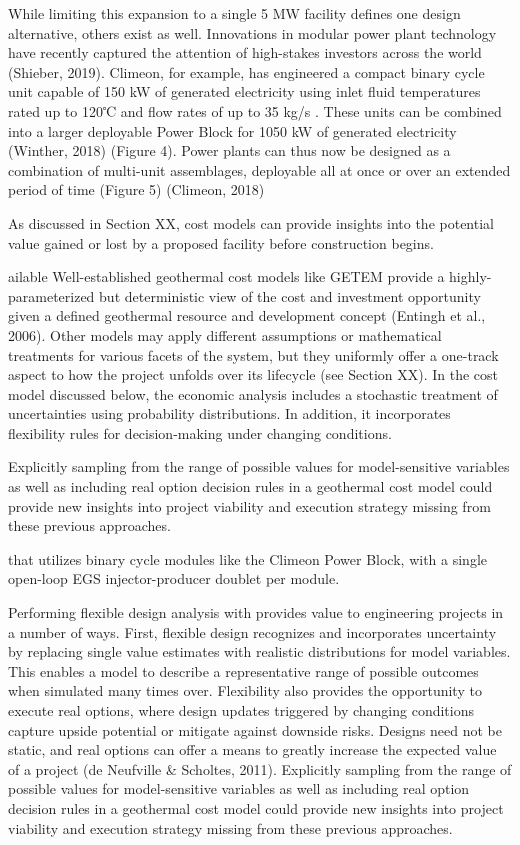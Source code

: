 While limiting this expansion to a single 5 MW facility defines one design alternative, others exist as well. Innovations in modular power plant technology have recently captured the attention of high-stakes investors across the world (Shieber, 2019). Climeon, for example, has engineered a compact binary cycle unit capable of 150 kW of generated electricity using inlet fluid temperatures rated up to 120℃ and flow rates of up to 35 kg/s \citep{climeon_climeon_2021}. These units can be combined into a larger deployable Power Block for 1050 kW of generated electricity (Winther, 2018) (Figure 4). Power plants can thus now be designed as a combination of multi-unit assemblages, deployable all at once or over an extended period of time (Figure 5) (Climeon, 2018)





As discussed in Section XX, cost models can provide insights into the potential value gained or lost by a proposed facility before construction begins.

ailable 
Well-established geothermal cost models like GETEM provide a highly-parameterized but deterministic view of the cost and investment opportunity given a defined geothermal resource and development concept (Entingh et al., 2006). Other models may apply different assumptions or mathematical treatments for various facets of the system, but they uniformly offer a one-track aspect to how the project unfolds over its lifecycle (see Section XX). In the cost model discussed below, the economic analysis includes a stochastic treatment of uncertainties using probability distributions. In addition, it incorporates flexibility rules for decision-making under changing conditions.  


Explicitly sampling from the range of possible values for model-sensitive variables as well as including real option decision rules in a geothermal cost model could provide new insights into project viability and execution strategy missing from these previous approaches.

that utilizes binary cycle modules like the Climeon Power Block, with a single open-loop EGS injector-producer doublet per module. 



Performing flexible design analysis with provides value to engineering projects in a number of ways. First, flexible design recognizes and incorporates uncertainty by replacing single value estimates with realistic distributions for model variables. This enables a model to describe a representative range of possible outcomes when simulated many times over. Flexibility also provides the opportunity to execute real options, where design updates triggered by changing conditions capture upside potential or mitigate against downside risks. Designs need not be static, and real options can offer a means to greatly increase the expected value of a project (de Neufville \& Scholtes, 2011).
 Explicitly sampling from the range of possible values for model-sensitive variables as well as including real option decision rules in a geothermal cost model could provide new insights into project viability and execution strategy missing from these previous approaches.




